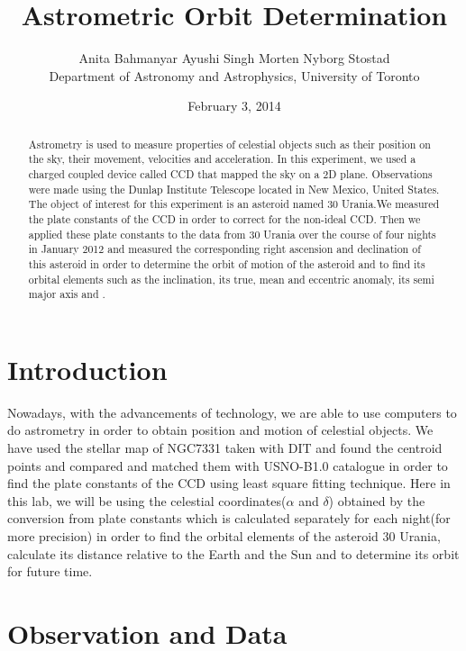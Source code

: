 \documentclass[letterpaper,12pt]{article}
\title{Astrometric Orbit Determination }
\author{Anita Bahmanyar \qquad Ayushi Singh \qquad Morten Nyborg Stostad \\Department of Astronomy and Astrophysics, University of Toronto}
\affil{\small {Written by: Anita Bahmanyar}}
\affil{\small {anita.bahmanyar@mail.utoronto.ca}}
\affil{\small {Student Number: 998909098}}
\date{February 3, 2014}
\begin{document}
\maketitle

\begin{abstract}
\label{abstract}
Astrometry is used to measure properties of celestial objects such as their position on the sky, their movement, velocities and acceleration. In this experiment, we used a charged coupled device called CCD that mapped the sky on a 2D plane. Observations were made using the Dunlap Institute Telescope located in New Mexico, United States. The object of interest for this experiment is an asteroid named 30 Urania.We measured the plate constants of the CCD in order to correct for the non-ideal CCD. Then we applied these plate constants to the data from 30 Urania over the course of four nights in January 2012 and measured the corresponding right ascension and declination of this asteroid in order to determine the orbit of motion of the asteroid and to find its orbital elements such as the inclination, its true, mean and eccentric anomaly, its semi major axis and .



\end{abstract}

\section{Introduction}
\label{sec:introduction}
Nowadays, with the advancements of technology, we are able to use computers to do astrometry in order to obtain position and motion of celestial objects. We have used the stellar map of NGC7331 taken with DIT and found the centroid points and compared and matched them with USNO-B1.0 catalogue in order to find the plate constants of the CCD using least square fitting technique. Here in this lab, we will be using the celestial coordinates(\begin{math} \alpha \end{math} and \begin{math} \delta \end{math}) obtained by the conversion from plate constants which is calculated separately for each night(for more precision) in order to find the orbital elements of the asteroid 30 Urania, calculate its distance relative to the Earth and the Sun and to determine its orbit for future time.


\section{Observation and Data}
\label{sec:observationanddata}
\end{document}
